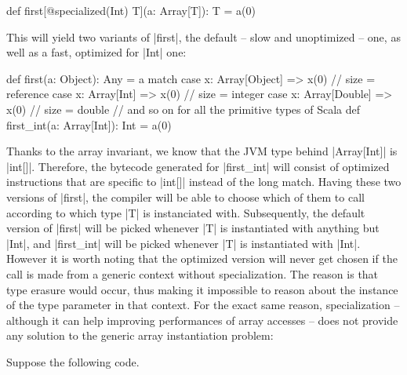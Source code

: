 
\begin{lstlisting-nobreak}
 def first[@specialized(Int) T](a: Array[T]): T = a(0)
\end{lstlisting-nobreak}

This will yield two variants of |first|, the default -- slow and unoptimized -- one, as well as a fast, optimized for |Int| one:

\begin{lstlisting-nobreak}
 def first(a: Object): Any =
   a match {
     case x: Array[Object] => x(0) // size = reference
     case x: Array[Int]    => x(0) // size = integer
     case x: Array[Double] => x(0) // size = double
     // and so on for all the primitive types of Scala
   }
 def first_int(a: Array[Int]): Int = a(0)
\end{lstlisting-nobreak}


Thanks to the array invariant, we know that the JVM type behind |Array[Int]| is |int[]|. Therefore, the bytecode generated for |first_int| will consist of optimized instructions that are specific to |int[]| instead of the long match. Having these two versions of |first|, the compiler will be able to choose which of them to call according to which type |T| is instanciated with. Subsequently, the default version of |first| will be picked whenever |T| is instantiated with anything but |Int|, and |first_int| will be picked whenever |T| is instantiated with |Int|. However it is worth noting that the optimized version will never get chosen if the call is made from a generic context without specialization. The reason is that type erasure would occur, thus making it impossible to reason about the instance of the type parameter in that context. For the exact same reason, specialization -- although it can help improving performances of array accesses -- does not provide any solution to the generic array instantiation problem:

Suppose the following code.

